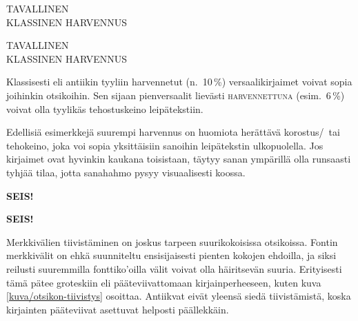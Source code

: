 \begin{koodilohkosis}
\large TAVALLINEN \\
{ KLASSINEN HARVENNUS}
\end{koodilohkosis}

\begin{tulossis}
  \large
  TAVALLINEN \\
  { KLASSINEN HARVENNUS}
\end{tulossis}

Klassisesti eli antiikin tyyliin harvennetut (n.~10\,\%)
versaalikirjaimet voivat sopia joihinkin otsikoihin. Sen sijaan
pienversaalit lievästi {
  \textsc{harvennettuna}} (esim.~6\,\%) voivat olla tyylikäs
tehostuskeino leipätekstiin.

Edellisiä esimerkkejä suurempi harvennus on huomiota herättävä
korostus\-/\ tai tehokeino, joka voi sopia yksittäisiin sanoihin
leipätekstin ulkopuolella. Jos kirjaimet ovat hyvinkin kaukana
toisistaan, täytyy sanan ympärillä olla runsaasti tyhjää tilaa, jotta
sanahahmo pysyy visuaalisesti koossa.

\begin{koodilohkosis}
{\sffamily\bfseries{} SEIS!}
\end{koodilohkosis}

\begin{tulossis}
  {\sffamily\bfseries{} SEIS!}
\end{tulossis}

Merkkivälien tiivistäminen on joskus tarpeen suurikokoisissa otsikoissa.
Fontin merkkivälit on ehkä suunniteltu ensisijaisesti pienten kokojen
ehdoilla, ja siksi reilusti suuremmilla fonttiko'oilla välit voivat olla
häiritsevän suuria. Erityisesti tämä pätee groteskiin eli
pääteviivattomaan kirjainperheeseen, kuten kuva
\ref{kuva/otsikon-tiivistys} osoittaa. Antiikvat eivät yleensä siedä
tiivistämistä, koska kirjainten pääteviivat asettuvat helposti
päällekkäin.


